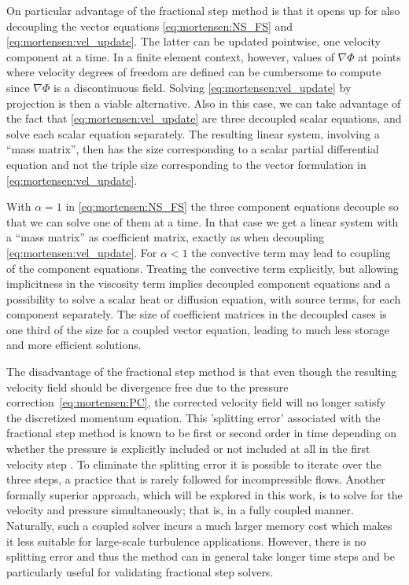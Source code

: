 On particular advantage of the fractional step method is that it opens
up for also decoupling the vector equations \eqref{eq:mortensen:NS_FS}
and \eqref{eq:mortensen:vel_update}. The latter can be updated
pointwise, one velocity component at a time. In a finite element
context, however, values of $\nabla\Phi$ at points where velocity
degrees of freedom are defined can be cumbersome to compute since
$\nabla\Phi$ is a discontinuous field. Solving
\eqref{eq:mortensen:vel_update} by projection is then a viable
alternative. Also in this case, we can take advantage of the fact that
\eqref{eq:mortensen:vel_update} are three decoupled scalar equations,
and solve each scalar equation separately.  The resulting linear
system, involving a ``mass matrix'', then has the size corresponding
to a scalar partial differential equation and not the triple size
corresponding to the vector formulation in
\eqref{eq:mortensen:vel_update}.

With $\alpha =1$ in \eqref{eq:mortensen:NS_FS} the three component
equations decouple so that we can solve one of them at a time. In that
case we get a linear system with a ``mass matrix'' as coefficient
matrix, exactly as when decoupling \eqref{eq:mortensen:vel_update}.
For $\alpha <1$ the convective term may lead to coupling of the
component equations. Treating the convective term explicitly, but
allowing implicitness in the viscosity term implies decoupled
component equations and a possibility to solve a scalar heat or
diffusion equation, with source terms, for each component separately.
The size of coefficient matrices in the decoupled cases is one third
of the size for a coupled vector equation, leading to much less
storage and more efficient solutions.

The disadvantage of the fractional step method is that even though the
resulting velocity field should be divergence free due to the pressure
correction~\eqref{eq:mortensen:PC}, the corrected velocity field will
no longer satisfy the discretized momentum equation. This 'splitting
error' associated with the fractional step method is known to be first
or second order in time depending on whether the pressure is
explicitly included or not included at all in the first velocity
step \citep{GuermondMinevShen2006}. To eliminate the splitting error
it is possible to iterate over the three steps, a practice that is
rarely followed for incompressible flows. Another formally superior
approach, which will be explored in this work, is to solve for the
velocity and pressure simultaneously; that is, in a fully coupled
manner.  Naturally, such a coupled solver incurs a much larger memory
cost which makes it less suitable for large-scale turbulence
applications. However, there is no splitting error and thus the method
can in general take longer time steps and be particularly useful for
validating fractional step solvers.


